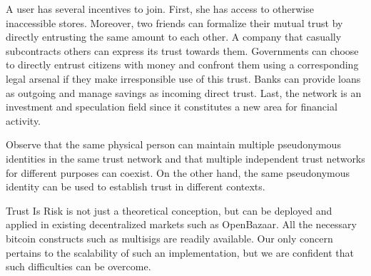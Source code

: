   A user has several incentives to join. First, she has access to otherwise inaccessible stores. Moreover, two friends can
  formalize their mutual trust by directly entrusting the same amount to each other. A company that casually subcontracts
  others can express its trust towards them. Governments can choose to directly entrust citizens with money and confront them
  using a corresponding legal arsenal if they make irresponsible use of this trust. Banks can provide loans as outgoing and
  manage savings as incoming direct trust. Last, the network is an investment and speculation field since it constitutes a new
  area for financial activity.

  Observe that the same physical person can maintain multiple pseudonymous identities in the same trust network and that
  multiple independent trust networks for different purposes can coexist. \ifdefined\proceedings \else On the other hand, the
  same pseudonymous identity can be used to establish trust in different contexts.\fi
  
  Trust Is Risk is not just a theoretical conception, but can be deployed and applied in existing decentralized markets such
  as OpenBazaar. All the necessary bitcoin constructs such as multisigs are readily available. Our only concern pertains to
  the scalability of such an implementation, but we are confident that such difficulties can be overcome.
